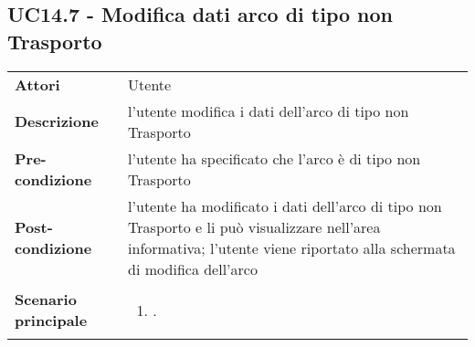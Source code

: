 \subsection{UC14.7 - Modifica dati arco di tipo non Trasporto} 
\label{sssec:UC14.7} 
\def\arraystretch{1.5}
\begin{tabularx}{\textwidth}{l|p{}}
	\rowcolor{I} \multicolumn{2}{c}{\color{white}\textbf{UC14.7 - Modifica dati arco di tipo non Trasporto}} \\
	\toprule
	\endhead
	\textbf{Attori} & Utente\\
	\textbf{Descrizione} & l'utente modifica i dati dell'arco di tipo non Trasporto\\
	\textbf{Pre-condizione} & l'utente ha specificato che l'arco è di tipo non Trasporto\\
	\textbf{Post-condizione} & l'utente ha modificato i dati dell'arco di tipo non Trasporto e li può visualizzare nell'area informativa; l'utente viene riportato alla schermata di modifica dell'arco\\
	\textbf{Scenario principale} & \vspace{-1.2em}\begin{enumerate}[leftmargin=*,noitemsep,nosep]
		\item \nameref{sssec:UC14.7}.
	\end{enumerate}\\
	\bottomrule
\end{tabularx}
